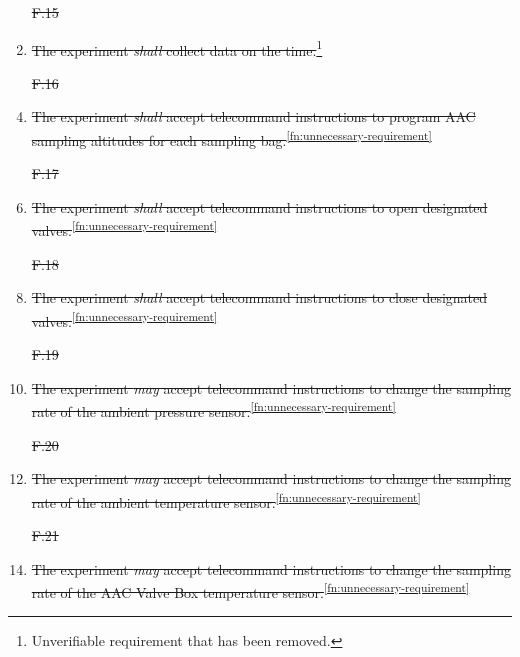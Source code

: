 \documentclass[a4paper,12pt,twoside, final]{article}
\providecommand{\DIFdeltex}[1]{{\protect\color{red}\sout{#1}}}                      %
\providecommand{\DIFaddbegin}{} %
\providecommand{\DIFaddend}{} %
\providecommand{\DIFdelbegin}{} %
\providecommand{\DIFdelend}{} %
\providecommand{\DIFdel}[1]{\texorpdfstring{\DIFdeltex{#1}}{}} %
\newcommand{\DIFscaledelfig}{0.5}
\newlength{\DIFdelgraphicswidth} %
\newlength{\DIFdelgraphicsheight} %
\newcommand{\DIFaddincludegraphics}[2][]{{\color{blue}\fbox{\DIFOincludegraphics[#1]{#2}}}} %
\newcommand{\DIFdelincludegraphics}[2][]{%
\sbox{\DIFdelgraphicsbox}{\DIFOincludegraphics[#1]{#2}}%
\settoboxwidth{\DIFdelgraphicswidth}{\DIFdelgraphicsbox} %
\settoboxtotalheight{\DIFdelgraphicsheight}{\DIFdelgraphicsbox} %
\scalebox{\DIFscaledelfig}{%
\parbox[b]{\DIFdelgraphicswidth}{\usebox{\DIFdelgraphicsbox}\\[-\baselineskip] \rule{\DIFdelgraphicswidth}{0em}}\llap{\resizebox{\DIFdelgraphicswidth}{\DIFdelgraphicsheight}{%
\setlength{\unitlength}{\DIFdelgraphicswidth}%
\begin{picture}(1,1)%
\thicklines\linethickness{2pt} %
{\color[rgb]{1,0,0}\put(0,0){\framebox(1,1){}}}%
{\color[rgb]{1,0,0}\put(0,0){\line( 1,1){1}}}%
{\color[rgb]{1,0,0}\put(0,1){\line(1,-1){1}}}%
\end{picture}%
}\hspace*{3pt}}} %
} %
\DeclareRobustCommand{\DIFaddbegin}{\DIFOaddbegin \let\includegraphics\DIFaddincludegraphics} %
\DeclareRobustCommand{\DIFaddend}{\DIFOaddend \let\includegraphics\DIFOincludegraphics} %
\DeclareRobustCommand{\DIFdelbegin}{\DIFOdelbegin \let\includegraphics\DIFdelincludegraphics} %
\DeclareRobustCommand{\DIFdelend}{\DIFOaddend \let\includegraphics\DIFOincludegraphics} %
\begin{document}
\begin{enumerate}[label=F.\arabic*]
    \DIFdelbegin %
\item[\DIFdel{F.15}]%
\DIFdelend \DIFaddbegin \item \DIFaddend \st{The experiment \textit{shall} collect data on the time.}\footnote{Unverifiable requirement that has been removed.\label{fn:unverifiable-requirement}}
    \DIFdelbegin %
\item[\DIFdel{F.16}]%
\DIFdelend \DIFaddbegin \item \DIFaddend \st{The experiment \textit{shall} accept telecommand instructions to program AAC sampling altitudes for each sampling bag.}\textsuperscript{\ref{fn:unnecessary-requirement}}
    \DIFdelbegin %
\item[\DIFdel{F.17}]%
\DIFdelend \DIFaddbegin \item \DIFaddend \st{The experiment \textit{shall} accept telecommand instructions to open designated valves.}\textsuperscript{\ref{fn:unnecessary-requirement}}
    \DIFdelbegin %
\item[\DIFdel{F.18}]%
\DIFdelend \DIFaddbegin \item \DIFaddend \st{The experiment \textit{shall} accept telecommand instructions to close designated valves.}\textsuperscript{\ref{fn:unnecessary-requirement}}
    \DIFdelbegin %
\item[\DIFdel{F.19}]%
\DIFdelend \DIFaddbegin \item \DIFaddend \st{The experiment \textit{may} accept telecommand instructions to change the sampling rate of the ambient pressure sensor.}\textsuperscript{\ref{fn:unnecessary-requirement}}
    \DIFdelbegin %
\item[\DIFdel{F.20}]%
\DIFdelend \DIFaddbegin \item \DIFaddend \st{The experiment \textit{may} accept telecommand instructions to change the sampling rate of the ambient temperature sensor.}\textsuperscript{\ref{fn:unnecessary-requirement}}
    \DIFdelbegin %
\item[\DIFdel{F.21}]%
\DIFdelend \DIFaddbegin \item \DIFaddend \st{The experiment \textit{may} accept telecommand instructions to change the sampling rate of the AAC Valve Box temperature sensor.}\textsuperscript{\ref{fn:unnecessary-requirement}}

\end{enumerate}
\end{document}
